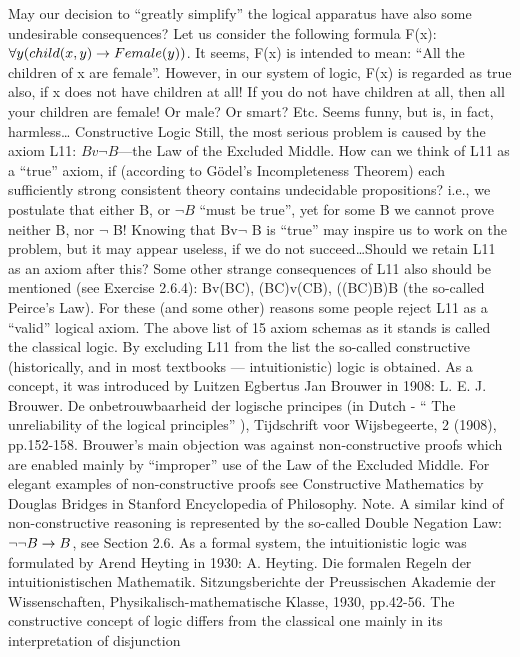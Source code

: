 May our decision to ``greatly simplify'' the logical apparatus have also some undesirable consequences?
Let us consider the following formula F(x): \(\forall y(child(x, y)\rightarrow Female(y))\).
It seems, F(x) is intended to mean: ``All the children of x are female''. However, in our system of logic, F(x) is regarded as true also, if
x does not have children at all! If you do not have children at all, then all your children are female! Or
male? Or smart? Etc. Seems funny, but is, in fact, harmless\ldots 
Constructive Logic
Still, the most serious problem is caused by the axiom L11: \(Bv\neg B\)---the Law of the Excluded Middle.
How can we think of L11 as a ``true'' axiom, if (according to G\"{o}del's Incompleteness Theorem) each sufficiently strong consistent theory contains undecidable propositions? i.e., we postulate that either B, or
\(\neg B\) ``must be true'', yet for some B we cannot prove neither B, nor \(\neg\) B! Knowing that Bv\(\neg\) B is ``true'' may
inspire us to work on the problem, but it may appear useless, if we do not succeed\ldots  Should we retain L11
as an axiom after this?
Some other strange consequences of L11 also should be mentioned (see Exercise 2.6.4):
Bv(B\IMPLIES C),
(B\IMPLIES C)v(C\IMPLIES B),
((B\IMPLIES C)\IMPLIES B)\IMPLIES B (the so-called Peirce's Law).
For these (and some other) reasons some people reject L11 as a ``valid'' logical axiom.
The above list of 15 axiom schemas as it stands is called the classical logic.
By excluding L11 from the list the so-called constructive (historically, and in most textbooks ---
intuitionistic) logic is obtained. As a concept, it was introduced by Luitzen Egbertus Jan Brouwer in
1908:
L. E. J. Brouwer. De onbetrouwbaarheid der logische principes (in Dutch - `` The unreliability of the logical principles'' ),
Tijdschrift voor Wijsbegeerte, 2 (1908), pp.152-158.
Brouwer's main objection was against non-constructive proofs which are enabled mainly by ``improper''
use of the Law of the Excluded Middle.
For elegant examples of non-constructive proofs see Constructive Mathematics by Douglas Bridges in
Stanford Encyclopedia of Philosophy.
Note. A similar kind of non-constructive reasoning is represented by the so-called Double Negation Law:
\(\neg \neg B\rightarrow B\), see Section 2.6.
As a formal system, the intuitionistic logic was formulated by Arend Heyting in 1930:
A. Heyting. Die formalen Regeln der intuitionistischen Mathematik. Sitzungsberichte der Preussischen Akademie der
Wissenschaften, Physikalisch-mathematische Klasse, 1930, pp.42-56.
The constructive concept of logic differs from the classical one mainly in its interpretation of disjunction
